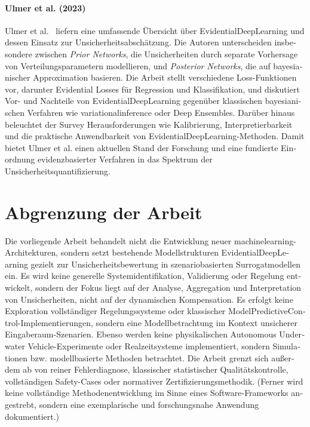 

\begin{otherlanguage}{ngerman}

\paragraph{Ulmer et al. (2023)}
Ulmer et al.~\parencite{Ulmer2023} liefern eine umfassende Übersicht über \gls{EvidentialDeepLearning} und dessen Einsatz zur Unsicherheitsabschätzung. Die Autoren unterscheiden insbesondere zwischen \emph{Prior Networks}, die Unsicherheiten durch separate Vorhersage von Verteilungsparametern modellieren, und \emph{Posterior Networks}, die auf bayesianischer Approximation basieren. Die Arbeit stellt verschiedene Loss-Funktionen vor, darunter Evidential Losses für Regression und Klassifikation, und diskutiert Vor- und Nachteile von \gls{EvidentialDeepLearning} gegenüber klassischen bayesianischen Verfahren wie \gls{variationalinference} oder Deep Ensembles. Darüber hinaus beleuchtet der Survey Herausforderungen wie Kalibrierung, Interpretierbarkeit und die praktische Anwendbarkeit von \gls{EvidentialDeepLearning}-Methoden. Damit bietet Ulmer et al. einen aktuellen Stand der Forschung und eine fundierte Einordnung evidenzbasierter Verfahren in das Spektrum der Unsicherheitsquantifizierung. 

\section{Abgrenzung der Arbeit}

Die vorliegende Arbeit behandelt nicht die Entwicklung neuer \gls{machinelearning}-Architekturen, sondern setzt bestehende Modellstrukturen \gls{EvidentialDeepLearning} gezielt zur Unsicherheitsbewertung in szenariobasierten Surrogatmodellen ein. Es wird keine generelle Systemidentifikation, Validierung oder Regelung entwickelt, sondern der Fokus liegt auf der Analyse, Aggregation und Interpretation von Unsicherheiten, nicht auf der dynamischen Kompensation.
Es erfolgt keine Exploration vollständiger Regelungssysteme oder klassischer \gls{ModelPredictiveControl}-Implementierungen, sondern eine Modellbetrachtung im Kontext unsicherer Eingaberaum-Szenarien. Ebenso werden keine physikalischen \gls{Autonomous Underwater Vehicle}-Experimente oder Realzeitsysteme implementiert, sondern Simulationen bzw. modellbasierte Methoden betrachtet. Die Arbeit grenzt sich außerdem ab von reiner Fehlerdiagnose, klassischer statistischer Qualitätskontrolle, vollständigen Safety-Cases oder normativer Zertifizierungsmethodik. (Ferner wird keine vollständige Methodenentwicklung im Sinne eines Software-Frameworks angestrebt, sondern eine exemplarische und forschungsnahe Anwendung dokumentiert.)

\end{otherlanguage}
